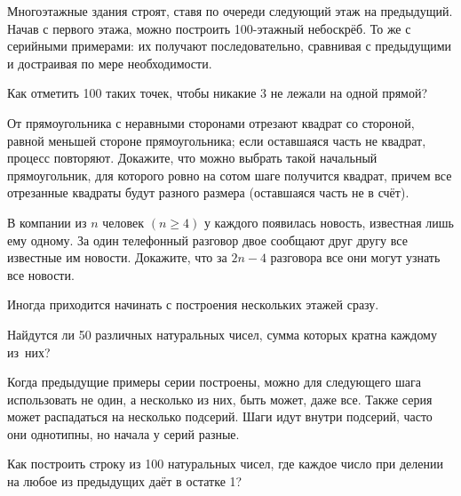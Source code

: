\documentclass[12pt,a4paper]{article}
\begin{document}

Многоэтажные здания строят, ставя по очереди следующий этаж на предыдущий.
Начав с первого этажа, можно построить 100-этажный небоскрёб.
То же с серийными примерами: их получают последовательно, сравнивая с предыдущими и достраивая по мере необходимости.

Как отметить 100 таких точек, чтобы никакие 3 не лежали на одной прямой?


От прямоугольника с неравными сторонами отрезают квадрат со стороной, равной меньшей стороне прямоугольника;
если оставшаяся часть не квадрат, процесс повторяют.
Докажите, что можно выбрать такой начальный прямоугольник, для которого ровно на сотом шаге получится квадрат,
причем все отрезанные квадраты будут разного размера (оставшаяся часть не в счёт).

В компании из $n$ человек $(n\geq4)$ у каждого появилась новость, известная
лишь ему одному. За один телефонный разговор двое сообщают друг другу
все известные им новости. Докажите, что за $2n-4$ разговора все они
могут узнать все новости.


Иногда приходится начинать с построения нескольких этажей сразу.

Найдутся ли 50 различных натуральных чисел, сумма которых кратна каждому из~них?



Когда предыдущие примеры серии построены, можно для следующего шага использовать не один, а несколько из них, быть может, даже все.
Также серия может распадаться на несколько подсерий. Шаги идут внутри подсерий, часто они однотипны, но начала у серий разные.


Как построить строку из 100 натуральных чисел, где каждое число при делении на
любое из предыдущих даёт в остатке 1?

%
\end{document}
